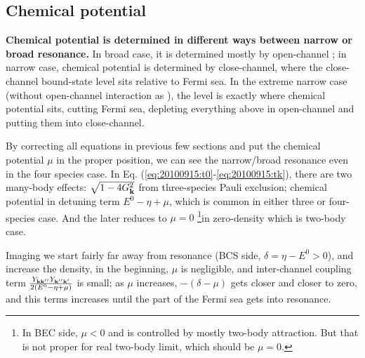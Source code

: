\documentclass{article}
\renewcommand{\emph}[1]{\textbf{#1}}
\begin{document}
\subsection{Chemical potential}
\emph{Chemical potential is determined in different ways between narrow or broad resonance.  }In broad case, it is determined mostly by open-channel ; in narrow case, chemical potential is determined by close-channel, where the close-channel bound-state level sits relative to Fermi sea.  In the extreme narrow case (without open-channel interaction as \cite{GurarieNarrow}), the level is exactly where chemical potential sits, cutting Fermi sea, depleting everything above in open-channel and putting them into close-channel.   

By correcting all equations in previous few sections and put the chemical potential $\mu$ in the proper position, we can see the narrow/broad resonance even in the four species case.  In Eq. (\ref{eq:20100915:t0}-\ref{eq:20100915:tk}), there are two many-body effects: $\sqrt{1-4G_{\mathbf{k}}^{2}}$ from three-species Pauli exclusion; chemical potential in detuning term $E^{0}-\eta+\mu$, which is common in either three or four-species case.  And the later reduces to $\mu=0$ \footnote{In BEC side, $\mu<0$ and is controlled by mostly two-body attraction.  But that is not proper for real two-body limit, which should be $\mu=0$.}in zero-density which is two-body case. 

Imaging we start fairly far away from resonance (BCS side, $\delta=\eta-E^{0}>0$), and increase the density, in the beginning, $\mu$ is negligible, and inter-channel coupling term $\frac{Y_{\mathbf{k}\mathbf{k}''}Y_{\mathbf{k}''\mathbf{k}'}}{2(E^{0}-\eta+\mu)} $ is small; as $\mu$  increases, $-(\delta-\mu)$ gets closer and closer to zero, and this terms increases until the part of the Fermi sea gets into resonance.  
\end{document}
